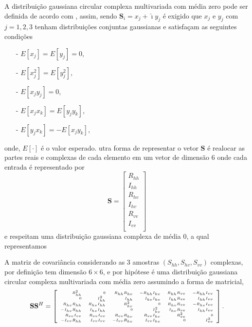 A distribuição gaussiana circular complexa multivariada com média zero pode ser definida de acordo com \citet{goodman}, assim, sendo $\mathbf{S}_i= x_j+\hat{\imath}y_j$ é exigido que $x_j$ e $y_j$ com $j=1,2,3$ tenham distribuições conjuntas gaussianas e satisfaçam as seguintes condições 
\begin{itemize}
	\item[-] $E[x_j]=E[y_j]=0$,
	\item[-] $E[x_j^2]=E[y_j^2]$,
	\item[-] $E[x_jy_j]=0$,
	\item[-] $E[x_jx_k]=E[y_jy_k]$,
	\item[-] $E[y_jx_k]=-E[x_jy_k]$,
\end{itemize}
onde, $E[\cdot]$ é o valor esperado.
utra forma de representar o vetor $\mathbf{S}$ é realocar as partes reais e complexas de cada elemento em um vetor de dimensão $6$ onde cada entrada é representado por
\begin{equation}
\mathbf{S} = \left[
\begin{array}{c}
	R_{hh}     \\
    I_{hh}     \\
	R_{hv}     \\
	I_{hv}     \\
    R_{vv}     \\
	I_{vv}     \\
\end{array}
\right]
\end{equation}
e respeitam uma distribuição gaussiana complexa de média 0, a qual representamos 

A matriz de covariância considerando as 3 amostras $(S_{hh}, S_{hv}, S_{vv})$ complexas, por definição tem dimensão $6 \times 6$, e por hipótese é uma distribuição gaussiana circular complexa multivariada com média zero assumindo a forma de matricial,  
\begin{equation*}
\tiny
\mathbf{S} \mathbf{S}^H= \left[
\begin{array}{rrrrrr}
	R_{hh}^2       & 0            &R_{hh}R_{hv}  &-R_{hh}I_{hv} &R_{hh}R_{vv} &-R_{hh}I_{vv}    \\
    0              & I_{hh}^2     &I_{hh}        &I_{hv}I_{hv}  &I_{hh}R_{vv}  &I_{hh}I_{vv}   \\
	R_{hv}R_{hh}   & R_{hv}I_{hh} &R_{hv}^2      & 0            &R_{hv}R_{vv}  &-R_{hv}I_{vv}     \\
	-I_{hv}R_{hh}  & I_{hv}I_{hh} &0             &I_{hv}^2      &I_{hv}R_{vv}  &I_{hh}I_{vv} \\
    R_{vv}I_{vv}   & R_{vv}I_{vv} &R_{vv}R_{hv}  &R_{vv}I_{hv}  &R_{vv}^2      &0            \\
	-I_{vv}R_{hh}  & I_{vv}I_{vv} &-I_{vv}R_{hv} &I_{vv}I_{hv}  &0             &I_{vv}^2     \\
\end{array}
\right].
\end{equation*}

